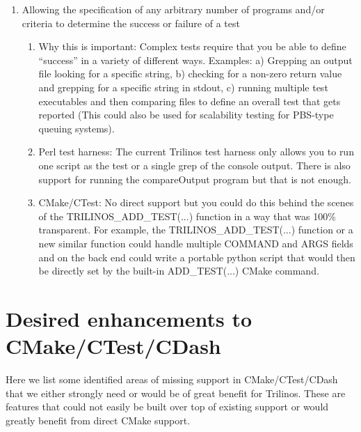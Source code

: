 \documentclass[pdf,ps2pdf,11pt]{SANDreport}
\begin{document}
\begin{enumerate}
\begin{enumerate}
  \end{enumerate}

{}\item Allowing the specification of any arbitrary number of programs
and/or criteria to determine the success or failure of a test

  \begin{enumerate}

  {}\item Why this is important: Complex tests require that you be
  able to define ``success'' in a variety of different ways.
  Examples: a) Grepping an output file looking for a specific string,
  b) checking for a non-zero return value and grepping for a specific
  string in stdout, c) running multiple test executables and then
  comparing files to define an overall test that gets reported (This
  could also be used for scalability testing for PBS-type queuing
  systems).

  {}\item Perl test harness: The current Trilinos test harness only
  allows you to run one script as the test or a single grep of the
  console output.  There is also support for running the compareOutput
  program but that is not enough.

  {}\item CMake/CTest: No direct support but you could do this behind
  the scenes of the TRILINOS\_ADD\_TEST(...) function in a way that
  was 100\% transparent.  For example, the TRILINOS\_ADD\_TEST(...) 
  function or a new similar function could handle multiple COMMAND and
  ARGS fields and on the back end could write a portable python script
  that would then be directly set by the built-in ADD\_TEST(...) CMake
  command.

  \end{enumerate}

\end{enumerate}

%
\section{Desired enhancements to CMake/CTest/CDash}
%

Here we list some identified areas of missing support in
CMake/CTest/CDash that we either strongly need or would be of great
benefit for Trilinos.  These are features that could not easily be
built over top of existing support or would greatly benefit from
direct CMake support.
\end{document}
